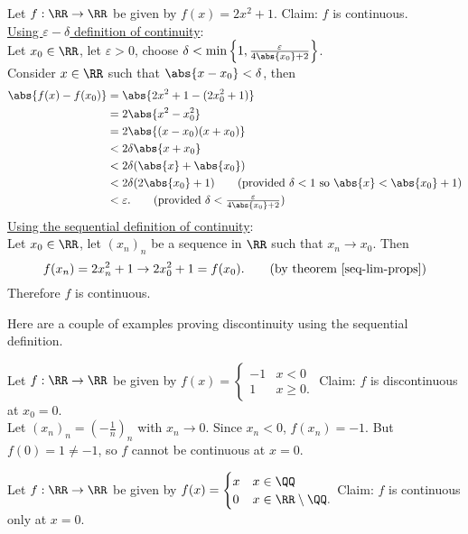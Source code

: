 \documentclass[../real_analysis.tex]{subfiles}
\begin{document}
        \begin{example}
            Let $f: \RR\to\RR$ be given by $f(x)=2x^2+1$. Claim: $f$ is continuous.\\
            \underline{Using $\varepsilon-\delta$ definition of continuity}:\\
            Let $x_0\in\RR$, let $\varepsilon>0$, choose $\delta<\min\left\{1, \frac{\varepsilon}{4\abs{x_0}+2}\right\}$.\\
            Consider $x\in\RR$ such that $\abs{x-x_0}<\delta$, then
            \begin{align*}
                \abs{f(x)-f(x_0)}&=\abs{2x^2+1-(2x_0^2+1)}\\
                &=2\abs{x^2-x_0^2}\\
                &=2\abs{(x-x_0)(x+x_0)}\\
                &<2\delta\abs{x+x_0}\\
                &<2\delta(\abs{x}+\abs{x_0})\\
                &<2\delta(2\abs{x_0}+1)\tag{provided $\delta<1$ so $\abs{x}<\abs{x_0}+1$}\\
                &<\varepsilon.\tag{provided $\delta<\frac{\varepsilon}{4\abs{x_0}+2}$}
            \end{align*}
            \underline{Using the sequential definition of continuity}:\\
            Let $x_0\in\RR$, let $(x_n)_n$ be a sequence in $\RR$ such that $x_n\to x_0$. Then
            \begin{equation*}
                f(x_n)=2x_n^2+1\to2x_0^2+1=f(x_0).\tag{by theorem \ref{seq-lim-props}}
            \end{equation*}
            Therefore $f$ is continuous.
        \end{example}
        Here are a couple of examples proving discontinuity using the sequential definition.
        \begin{example}
            Let $f: \RR\to\RR$ be given by $f(x)=\begin{cases}
                -1 & x<0\\
                1 & x\geq0.
            \end{cases}$ Claim: $f$ is discontinuous at $x_0=0$.\\
            Let $(x_n)_n=\left(-\frac{1}{n}\right)_n$ with $x_n\to0$. Since $x_n<0$, $f(x_n)=-1$. But $f(0)=1\neq-1$, so $f$ cannot be continuous at $x=0$.
        \end{example}
        \begin{example}
            Let $f: \RR\to\RR$ be given by $f(x)=\begin{cases}
                x & x\in\QQ\\
                0 & x\in\RR\setminus\QQ.
            \end{cases}$ Claim: $f$ is continuous only at $x=0$.
        \end{example}
\end{document}
